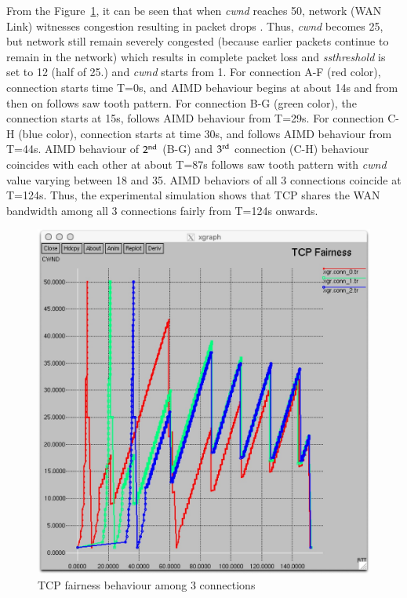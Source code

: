\begin{multicols}{2}
From the Figure~\ref{chap2-fig08}, it can be seen that when \textit{cwnd} reaches 50, network (WAN Link) witnesses congestion resulting in packet drops . Thus, \textit{cwnd} becomes 25, but network still remain severely congested (because earlier packets continue to remain in the network) which results in complete packet loss and \textit{ssthreshold} is set to 12 (half of 25.) and \textit{cwnd} starts from 1. For connection A-F (red color), connection starts time T=0s, and AIMD behaviour begins at about 14s and from then on follows saw tooth pattern. For connection B-G (green color), the connection starts at 15s, follows AIMD behaviour from T=29s. For connection C-H (blue color), connection starts at time 30s, and follows AIMD behaviour from T=44s. AIMD behaviour of ${\rm 2}^{\text{nd}}$ (B-G) and ${\rm 3}^{\text{rd}}$ connection (C-H) behaviour coincides with each other at about T=87s follows saw tooth pattern with \textit{cwnd} value varying between 18 and 35. AIMD behaviors of all 3 connections coincide at T=124s. Thus, the experimental simulation shows that TCP shares the WAN bandwidth among all 3 connections fairly from T=124s onwards.

\begin{figure}[H]
\centering
\includegraphics[scale=.85]{src/Figures/chap2/chap2-fig08.jpg}
\caption{TCP fairness behaviour among 3 connections}\label{chap2-fig08}
\end{figure}


\end{multicols}
